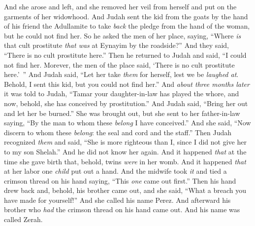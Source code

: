 \begin{biblechapter}
\verse And she arose and left, and she removed her veil from herself and put on the garments of her widowhood.
\verse And Judah sent the kid from the goats by the hand of his friend the Adullamite to take \textit{back} the pledge from the hand of the woman, but he could not find her.
\verse So he asked the men of her place, saying, “Where \textit{is} that cult prostitute \textit{that was} at Eynayim by the roadside?” And they said, “There is no cult prostitute here.”
\verse Then he returned to Judah and said, “I could not find her. Morever, the men of the place said, ‘There is no cult prostitute here.’ ”
\verse And Judah said, “Let her take \textit{them} for herself, lest we be \textit{laughed at}. Behold, I sent this kid, but you could not find her.”
\verse And \textit{about three months later} it was told to Judah, “Tamar your daughter-in-law has played the whore, and now, behold, she has conceived by prostitution.” And Judah said, “Bring her out and let her be burned.”
\verse She was brought out, but she sent to her father-in-law saying, “By the man to whom these \textit{belong} I have conceived.” And she said, “Now discern to whom these \textit{belong}: the seal and cord and the staff.”
\verse Then Judah recognized \textit{them} and said, “She is more righteous than I, since I did not give her to my son Shelah.” And he did not know her again.
\verse And it happened \textit{that} at the time she gave birth that, behold, twins \textit{were} in her womb.
\verse And it happened \textit{that} at her labor one \textit{child} put out a hand. And the midwife took \textit{it} and tied a crimson thread on his hand saying, “This \textit{one} came out first.”
\verse Then his hand drew back and, behold, his brother came out, and she said, “What a breach you have made for yourself!” And she called his name Perez.
\verse And afterward his brother who \textit{had} the crimson thread on his hand came out. And his name was called Zerah.
\end{biblechapter}

